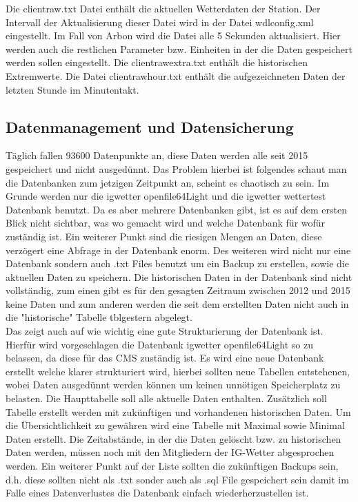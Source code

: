 Die clientraw.txt Datei enthält die aktuellen Wetterdaten der Station. Der Intervall der Aktualisierung dieser Datei wird in der Datei wdlconfig.xml eingestellt. Im Fall von Arbon wird die Datei alle 5 Sekunden aktualisiert.  Hier werden auch die restlichen Parameter bzw. Einheiten in der die Daten gespeichert werden sollen eingestellt. Die clientrawextra.txt enthält die historischen Extremwerte. Die Datei clientrawhour.txt enthält die aufgezeichneten Daten der letzten Stunde im Minutentakt.\cite{WeatherDisplay} \\


\subsection{Datenmanagement und Datensicherung}
Täglich fallen 93600 Datenpunkte an, diese Daten werden alle seit 2015 gespeichert und nicht ausgedünnt. Das Problem hierbei ist folgendes schaut man die Datenbanken zum jetzigen Zeitpunkt an, scheint es chaotisch zu sein. Im Grunde werden nur die igwetter openfile64Light und die igwetter wettertest Datenbank benutzt. Da es aber mehrere Datenbanken gibt,  ist es auf dem ersten Blick nicht sichtbar, was wo gemacht wird und welche Datenbank für wofür zuständig ist. Ein weiterer Punkt sind die riesigen Mengen an Daten, diese verzögert eine Abfrage in der Datenbank enorm. Des weiteren wird nicht nur eine Datenbank sondern auch .txt Files benutzt um ein Backup zu erstellen, sowie die aktuellen Daten zu speichern. Die historischen Daten in der Datenbank sind nicht vollständig, zum einen gibt es für den gesagten Zeitraum zwischen 2012 und 2015 keine Daten und zum anderen werden die seit dem erstellten Daten nicht auch in die "historische" Tabelle tblgestern abgelegt.\\

Das zeigt auch auf wie wichtig eine gute Strukturierung der Datenbank ist. Hierfür wird vorgeschlagen die Datenbank igwetter openfile64Light so zu belassen, da diese für das CMS zuständig ist. Es wird eine neue Datenbank erstellt welche klarer strukturiert wird, hierbei sollten neue Tabellen entstehenen, wobei Daten ausgedünnt werden können um keinen unnötigen Speicherplatz zu belasten. Die Haupttabelle soll alle aktuelle Daten enthalten. Zusätzlich soll Tabelle erstellt werden mit zukünftigen und vorhandenen historischen Daten. Um die Übersichtlichkeit zu gewähren wird eine Tabelle mit Maximal sowie Minimal Daten erstellt. Die Zeitabstände, in der die Daten gelöscht bzw. zu historischen Daten werden, müssen noch mit den Mitgliedern der IG-Wetter abgesprochen werden. Ein weiterer Punkt auf der Liste sollten die zukünftigen Backups sein, d.h. diese sollten nicht als .txt sonder auch als .sql File gespeichert sein damit im Falle eines Datenverlustes die Datenbank einfach wiederherzustellen ist.

